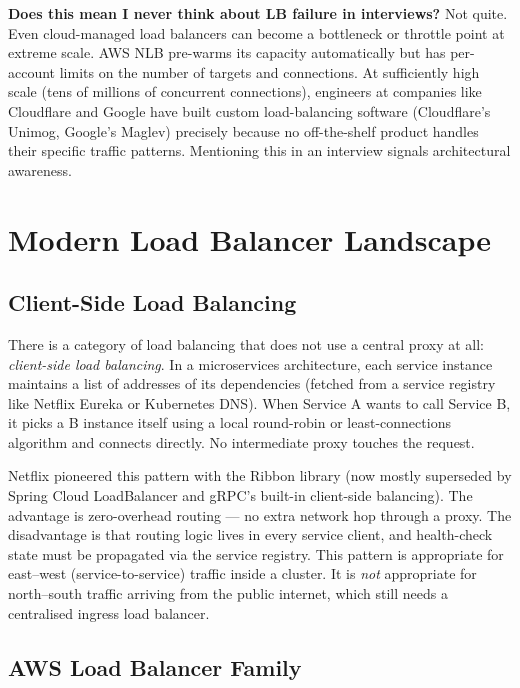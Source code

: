 \documentclass[11pt,a4paper]{article}
\begin{document}
\begin{thinkbox}
  \textbf{Does this mean I never think about LB failure in interviews?} Not quite. Even
  cloud-managed load balancers can become a bottleneck or throttle point at extreme scale. AWS NLB
  pre-warms its capacity automatically but has per-account limits on the number of targets and
  connections. At sufficiently high scale (tens of millions of concurrent connections), engineers
  at companies like Cloudflare and Google have built custom load-balancing software
  (Cloudflare's Unimog, Google's Maglev) precisely because no off-the-shelf product handles
  their specific traffic patterns. Mentioning this in an interview signals architectural awareness.
\end{thinkbox}

\section{Modern Load Balancer Landscape}

\subsection{Client-Side Load Balancing}

There is a category of load balancing that does not use a central proxy at all: \emph{client-side
load balancing}. In a microservices architecture, each service instance maintains a list of
addresses of its dependencies (fetched from a service registry like Netflix Eureka or Kubernetes
DNS). When Service A wants to call Service B, it picks a B instance itself using a local round-robin
or least-connections algorithm and connects directly. No intermediate proxy touches the request.

Netflix pioneered this pattern with the Ribbon library (now mostly superseded by Spring Cloud
LoadBalancer and gRPC's built-in client-side balancing). The advantage is zero-overhead routing
--- no extra network hop through a proxy. The disadvantage is that routing logic lives in every
service client, and health-check state must be propagated via the service registry. This pattern
is appropriate for east--west (service-to-service) traffic inside a cluster. It is \emph{not}
appropriate for north--south traffic arriving from the public internet, which still needs a
centralised ingress load balancer.

\subsection{AWS Load Balancer Family}
\end{document}
